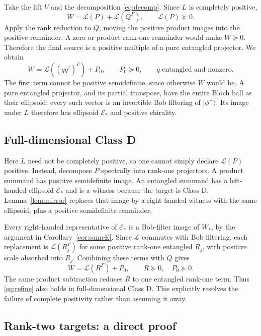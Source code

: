 \documentclass[11pt,a4paper]{article}
\theoremstyle{definition}\newtheorem{definition}[theorem]{Definition}
\newcommand{\E}{\mathcal E}
\newcommand{\ket}[1]{\lvert #1\rangle}
\theoremstyle{plain}\newtheorem*{theorem*}{Theorem}
\begin{document}
Take the lift $V$ and the decomposition \eqref{eq:decomp}. Since $L$ is completely positive,
\[
 W=\mathscr L(P)+\mathscr L(Q^\Gamma),\qquad\mathscr L(P)\succeq0.
\]
Apply the rank reduction to $Q$, moving the positive product images into the positive remainder. A zero or product rank-one remainder would make $W\succeq0$. Therefore the final source is a positive multiple of a pure entangled projector. We obtain
\begin{equation}\label{eq:refine}
 W=\mathscr L((qq^\dagger)^\Gamma)+P_0,
 \qquad P_0\succeq0,
 \qquad q\text{ entangled and nonzero}.
\end{equation}
The first term cannot be positive semidefinite, since otherwise $W$ would be. A pure entangled projector, and its partial transpose, have the entire Bloch ball as their ellipsoid: every such vector is an invertible Bob filtering of $\ket{\phi^+}$. Its image under $L$ therefore has ellipsoid $\E_*$ and positive chirality.

\subsection{Full-dimensional Class D}

Here $L$ need not be completely positive, so one cannot simply declare $\mathscr L(P)$ positive. Instead, decompose $P$ spectrally into rank-one projectors. A product summand has positive semidefinite image. An entangled summand has a left-handed ellipsoid $\E_*$ and is a witness because the target is Class D. Lemma~\ref{lem:mirror} replaces that image by a right-handed witness with the same ellipsoid, plus a positive semidefinite remainder.

Every right-handed representative of $\E_*$ is a Bob-filter image of $W_*$, by the argument in Corollary~\ref{cor:sameE}. Since $\mathscr L$ commutes with Bob filtering, each replacement is $\mathscr L(R_j^\Gamma)$ for some positive rank-one entangled $R_j$, with positive scale absorbed into $R_j$. Combining these terms with $Q$ gives
\[
 W=\mathscr L(R^\Gamma)+P_0,
 \qquad R\succeq0,\quad P_0\succeq0.
\]
The same product subtraction reduces $R$ to one entangled rank-one term. Thus \eqref{eq:refine} also holds in full-dimensional Class D. This explicitly resolves the failure of complete positivity rather than assuming it away.

\subsection{Rank-two targets: a direct proof}
\end{document}
